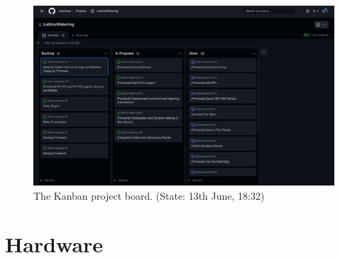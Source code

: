 \documentclass[acmtog, language=english, nonacm]{acmart}
\begin{document}
    \begin{figure}[!hbtp]
        \centering
        \includegraphics[width=\linewidth]{img/kanban_board.png}
        \caption{The Kanban project board. (State: 13th June, 18:32)}
        \label{fig:kanban_board}
    \end{figure}

    \section{Hardware} \label{sec:hardware}
\end{document}
